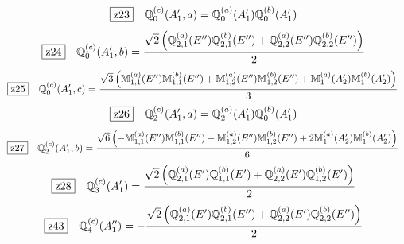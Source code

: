 \documentclass[fleqn,10pt,landscape]{jsarticle}
\begin{document}
\begin{dmath*}
\hspace*{3mm}\fbox{z23}\quad \mathbb{Q}_{0}^{(c)}(A_{1}^{\prime},a)=\mathbb{Q}_{0}^{(a)}(A_{1}^{\prime}) \mathbb{Q}_{0}^{(b)}(A_{1}^{\prime})
\end{dmath*}
\begin{dmath*}
\hspace*{3mm}\fbox{z24}\quad \mathbb{Q}_{0}^{(c)}(A_{1}^{\prime},b)=\frac{\sqrt{2} \left(\mathbb{Q}_{2,1}^{(a)}(E^{\prime\prime}) \mathbb{Q}_{2,1}^{(b)}(E^{\prime\prime}) + \mathbb{Q}_{2,2}^{(a)}(E^{\prime\prime}) \mathbb{Q}_{2,2}^{(b)}(E^{\prime\prime})\right)}{2}
\end{dmath*}
\begin{dmath*}
\hspace*{3mm}\fbox{z25}\quad \mathbb{Q}_{0}^{(c)}(A_{1}^{\prime},c)=\frac{\sqrt{3} \left(\mathbb{M}_{1,1}^{(a)}(E^{\prime\prime}) \mathbb{M}_{1,1}^{(b)}(E^{\prime\prime}) + \mathbb{M}_{1,2}^{(a)}(E^{\prime\prime}) \mathbb{M}_{1,2}^{(b)}(E^{\prime\prime}) + \mathbb{M}_{1}^{(a)}(A_{2}^{\prime}) \mathbb{M}_{1}^{(b)}(A_{2}^{\prime})\right)}{3}
\end{dmath*}
\begin{dmath*}
\hspace*{3mm}\fbox{z26}\quad \mathbb{Q}_{2}^{(c)}(A_{1}^{\prime},a)=\mathbb{Q}_{2}^{(a)}(A_{1}^{\prime}) \mathbb{Q}_{0}^{(b)}(A_{1}^{\prime})
\end{dmath*}
\begin{dmath*}
\hspace*{3mm}\fbox{z27}\quad \mathbb{Q}_{2}^{(c)}(A_{1}^{\prime},b)=\frac{\sqrt{6} \left(- \mathbb{M}_{1,1}^{(a)}(E^{\prime\prime}) \mathbb{M}_{1,1}^{(b)}(E^{\prime\prime}) - \mathbb{M}_{1,2}^{(a)}(E^{\prime\prime}) \mathbb{M}_{1,2}^{(b)}(E^{\prime\prime}) + 2 \mathbb{M}_{1}^{(a)}(A_{2}^{\prime}) \mathbb{M}_{1}^{(b)}(A_{2}^{\prime})\right)}{6}
\end{dmath*}
\begin{dmath*}
\hspace*{3mm}\fbox{z28}\quad \mathbb{Q}_{3}^{(c)}(A_{1}^{\prime})=\frac{\sqrt{2} \left(\mathbb{Q}_{2,1}^{(a)}(E^{\prime}) \mathbb{Q}_{1,1}^{(b)}(E^{\prime}) + \mathbb{Q}_{2,2}^{(a)}(E^{\prime}) \mathbb{Q}_{1,2}^{(b)}(E^{\prime})\right)}{2}
\end{dmath*}
\begin{dmath*}
\hspace*{3mm}\fbox{z43}\quad \mathbb{Q}_{4}^{(c)}(A_{1}^{\prime\prime})=- \frac{\sqrt{2} \left(\mathbb{Q}_{2,1}^{(a)}(E^{\prime}) \mathbb{Q}_{2,1}^{(b)}(E^{\prime\prime}) + \mathbb{Q}_{2,2}^{(a)}(E^{\prime}) \mathbb{Q}_{2,2}^{(b)}(E^{\prime\prime})\right)}{2}
\end{dmath*}
\end{document}
